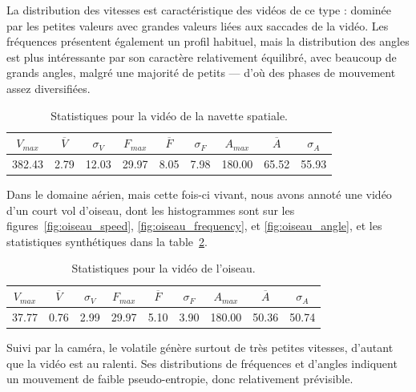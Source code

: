 	La distribution des vitesses est caractéristique des vidéos de ce type : dominée par les petites valeurs avec grandes valeurs liées aux saccades de la vidéo. Les fréquences présentent également un profil habituel, mais la distribution des angles est plus intéressante par son caractère relativement équilibré, avec beaucoup de grands angles, malgré une majorité de petits --- d'où des phases de mouvement assez diversifiées.
	
\begin{table}
	\centering
	\begin{tabular}{c c c c c c c c c}
		$V_{max}$	& $\overline{V}$	& $\sigma_{V}$	& $F_{max}$	& $\overline{F}$	& $\sigma_{F}$	& $A_{max}$	& $\overline{A}$	& $\sigma_{A}$	\bigstrut[b] \\ \hline

		382.43		& 2.79				& 12.03			& 29.97		& 8.05				& 7.98			& 180.00	& 65.52				& 55.93			\bigstrut[t] \\
	\end{tabular}
	\caption[Statistiques pour la vidéo de la navette spatiale]{Statistiques pour la vidéo de la navette spatiale.}
	\label{tab:spaceA_stats}
\end{table}

	Dans le domaine aérien, mais cette fois-ci vivant, nous avons annoté une vidéo d'un court vol d'oiseau, dont les histogrammes sont sur les figures~\ref{fig:oiseau_speed}, \ref{fig:oiseau_frequency}, et \ref{fig:oiseau_angle}, et les statistiques synthétiques dans la table~\ref{tab:oiseau_stats}.
	
\begin{table}
	\centering
	\begin{tabular}{c c c c c c c c c}
		$V_{max}$	& $\overline{V}$	& $\sigma_{V}$	& $F_{max}$	& $\overline{F}$	& $\sigma_{F}$	& $A_{max}$	& $\overline{A}$	& $\sigma_{A}$	\bigstrut[b] \\ \hline

		37.77		& 0.76				& 2.99			& 29.97		& 5.10				& 3.90			& 180.00	& 50.36				& 50.74			\bigstrut[t] \\
	\end{tabular}
	\caption[Statistiques pour la vidéo de l'oiseau]{Statistiques pour la vidéo de l'oiseau.}
	\label{tab:oiseau_stats}
\end{table}

	Suivi par la caméra, le volatile génère surtout de très petites vitesses, d'autant que la vidéo est au ralenti. Ses distributions de fréquences et d'angles indiquent un mouvement de faible pseudo-entropie, donc relativement prévisible.

